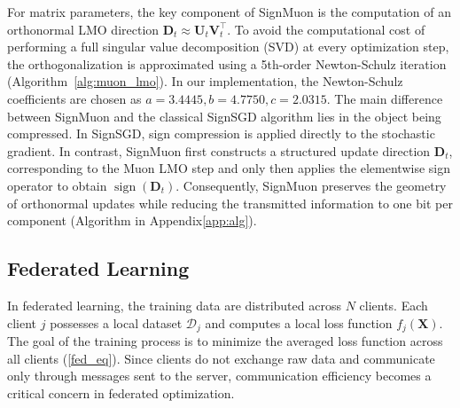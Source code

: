 \documentclass[letterpaper]{article} %
\begin{document}
For matrix parameters, the key component of SignMuon is the computation of an orthonormal LMO direction $\mathbf{D}_t \approx \mathbf{U}_t \mathbf{V}_t^\top$. To avoid the computational cost of performing a full singular value decomposition (SVD) at every optimization step, the orthogonalization is approximated using a 5th-order Newton-Schulz iteration (Algorithm~\ref{alg:muon_lmo}). In our implementation, the Newton-Schulz coefficients are chosen as $a=3.4445, b=4.7750, c=2.0315$. The main difference between SignMuon and the classical SignSGD algorithm lies in the object being compressed. In SignSGD, sign compression is applied directly to the stochastic gradient. In contrast, SignMuon first constructs a structured update direction $\mathbf{D}_t$, corresponding to the Muon LMO step and only then applies the elementwise sign operator to obtain $\operatorname{sign}(\mathbf{D}_t)$. Consequently, SignMuon preserves the geometry of orthonormal updates while reducing the transmitted information to one bit per component (Algorithm in Appendix\ref{app:alg}).

\subsection{Federated Learning}
In federated learning, the training data are distributed across $N$ clients. Each client $j$ possesses a local dataset $\mathcal{D}_j$ and computes a local loss function $f_j(\mathbf{X})$. The goal of the training process is to minimize the averaged loss function across all clients  (\ref{fed_eq}). Since clients do not exchange raw data and communicate only through messages sent to the server, communication efficiency becomes a critical concern in federated optimization.
\end{document}
